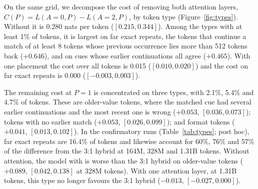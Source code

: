 On the same grid, we decompose the cost of removing both attention layers, $C(P) = L(A{=}0, P) -
L(A{=}2, P)$, by token type (Figure~\ref{fig:types}). Without \ingram{} it is
0.280 nats per token ($[0.215, 0.344]$). Among the types with at least 1\% of tokens, it is
largest on far exact repeats, the tokens that continue a match of at least 8 tokens whose previous
occurrence lies more than 512 tokens back ($+0.646$), and on cues whose earlier continuations all
agree ($+0.465$). With one placement the cost over all tokens is 0.015 ($[0.010, 0.020]$) and the
cost on far exact repeats is 0.000 ($[-0.003, 0.003]$).

The remaining cost at $P = 1$ is concentrated on three types, with 2.1\%, 5.4\% and 4.7\% of
tokens. These are older-value tokens, where the matched cue had several earlier continuations and
the most recent one is wrong ($+0.053$, $[0.036, 0.073]$); tokens with no earlier match ($+0.053$,
$[0.026, 0.099]$); and format tokens ($+0.041$, $[0.013, 0.102]$). In the confirmatory runs
(Table~\ref{tab:types}; post hoc), far exact repeats are 16.4\% of tokens and likewise account for 60\%,
76\% and 57\% of the difference from the 3:1 hybrid at 164M, 328M and 1.31B tokens. Without
attention, the model with \ingram{} is worse than the 3:1 hybrid on older-value tokens ($+0.089$,
$[0.042, 0.138]$ at 328M tokens). With one attention layer, at 1.31B tokens, this type no longer
favours the 3:1 hybrid ($-0.013$, $[-0.027, 0.000]$).
